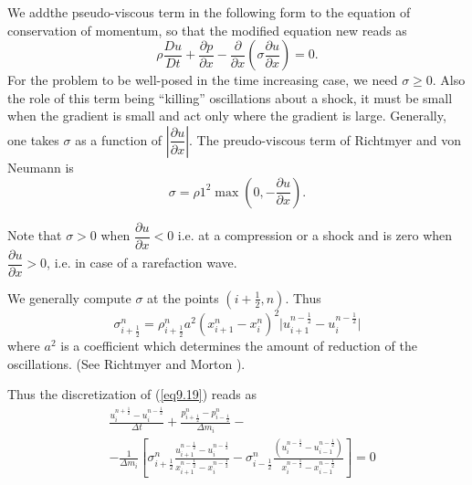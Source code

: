 We add\pageoriginale the pseudo-viscous term in the following form to the equation of conservation of momentum, so that the modified equation new reads as
\begin{equation*}
\rho \frac{Du}{Dt} + \frac{\partial p}{\partial x} -
\frac{\partial}{\partial x} \left(\sigma \frac{\partial u}{\partial x}\right) =
0. \tag{9.19}\label{eq9.19} 
\end{equation*}
For the problem to be well-posed in the time increasing case, we need $\sigma \geq 0$. Also the role of this term being ``killing'' oscillations about a shock, it must be small when the gradient is small and act only where the gradient is large. Generally, one takes $\sigma$ as a function of $|\dfrac{\partial u}{\partial x}|$. The preudo-viscous term of Richtmyer and von Neumann is 
\begin{equation*}
\sigma = \rho 1^2 \max \left(0, - \frac{\partial u}{\partial x}\right). 
\tag{9.20}\label{eq9.20}
\end{equation*}

\begin{remark}\label{chap9:rem9.1}
Note that $\sigma > 0$ when $\dfrac{\partial u}{\partial x} < 0$ i.e. at a compression or a shock and is zero when $\dfrac{\partial u}{\partial x} > 0$, i.e. in case of a rarefaction wave. 
\end{remark}

We generally compute $\sigma$ at the points $(i+\frac{1}{2}, n)$. Thus
\begin{equation*}
\sigma^n_{i+\frac{1}{2}} = \rho^n_{i+\frac{1}{2}} a^2 (x^n_{i+1} - x^n_i)^2 \big| u^{n-\frac{1}{2}}_{i+1} - u^{n-\frac{1}{2}}_i\big| \tag{9.21}\label{eq9.21}
\end{equation*}
where $a^2$ is a coefficient which determines the amount of reduction of the oscillations. (See Richtmyer and Morton \cite{key32}).

Thus the discretization of (\ref{eq9.19}) reads as
\begin{align*}
& \frac{u^{n+\frac{1}{2}}_i - u^{n-\frac{1}{2}}_i}{\Delta t}  + \frac{p^n_{i+\frac{1}{2}} - p^n_{i-\frac{1}{2}}}{\Delta m_i} - \\
& - \frac{1}{\Delta m_i} \left[ \sigma^n_{i+\frac{1}{2}}
    \frac{u^{n-\frac{1}{2}}_{i+1} -
      u^{n-\frac{1}{2}}_i}{x^{n-\frac{1}{2}}_{i+1} -
      x^{n-\frac{1}{2}}_i} - \sigma^n_{i-\frac{1}{2}}
    \frac{\left(u^{n-\frac{1}{2}}_i -
      u^{n-\frac{1}{2}}_{i-1}\right)}{x^{n-\frac{1}{2}}_i -
      x^{n-\frac{1}{2}}_{i-1}}  \right] = 0\tag{9.22}\label{eq9.22} 
\end{align*}

